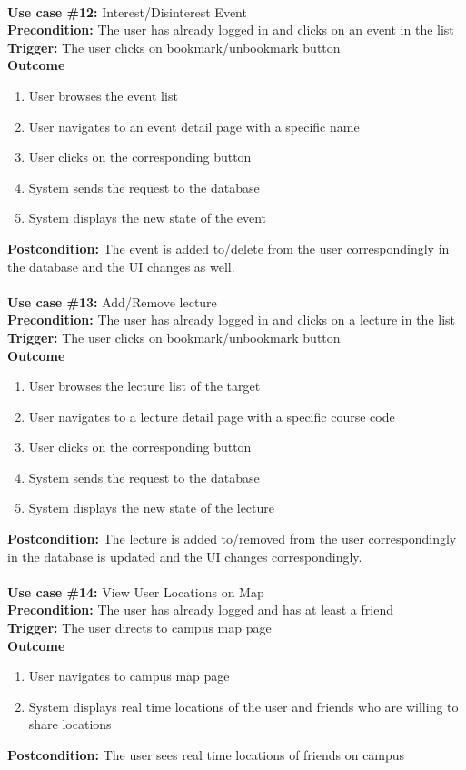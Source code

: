 \documentclass[12pt]{article}
\begin{document}
\noindent\\
\textbf{Use case \#12:} Interest/Disinterest Event\\
\textbf{Precondition:} The user has already logged in and clicks on an event in the list\\
\textbf{Trigger:} The user clicks on bookmark/unbookmark button\\
\textbf{Outcome}
\begin{enumerate}
	\item User browses the event list
	\item User navigates to an event detail page with a specific name
	\item User clicks on the corresponding button
    \item System sends the request to the database
    \item System displays the new state of the event
\end{enumerate}
\textbf{Postcondition:} The event is added to/delete from the user correspondingly in the database and the UI changes as well.\\


\noindent\\
\textbf{Use case \#13:} Add/Remove lecture\\
\textbf{Precondition:} The user has already logged in and clicks on a lecture in the list\\
\textbf{Trigger:} The user clicks on bookmark/unbookmark button\\
\textbf{Outcome}
\begin{enumerate}
	\item User browses the lecture list of the target
	\item User navigates to a lecture detail page with a specific course code
	\item User clicks on the corresponding button
    \item System sends the request to the database
    \item System displays the new state of the lecture
\end{enumerate}
\textbf{Postcondition:} The lecture is added to/removed from the user correspondingly in the database is updated and the UI changes correspondingly.\\


\noindent\\
\textbf{Use case \#14:} View User Locations on Map\\
\textbf{Precondition:} The user has already logged and has at least a friend\\
\textbf{Trigger:} The user directs to campus map page\\
\textbf{Outcome}
\begin{enumerate}
	\item User navigates to campus map page
    \item System displays real time locations of the user and friends who are willing to share locations
\end{enumerate}
\textbf{Postcondition:} The user sees real time locations of friends on campus
\end{document}
